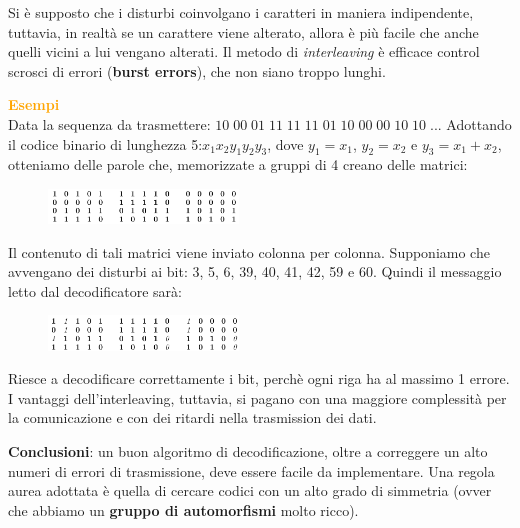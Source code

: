 \begin{flushleft}
    Si è supposto che i disturbi coinvolgano i caratteri in maniera indipendente, tuttavia, in realtà se un carattere viene alterato, allora è più facile che anche quelli vicini a lui vengano alterati. Il metodo di \textit{interleaving} è efficace control scrosci di errori (\textbf{burst errors}), che non siano troppo lunghi.

    \textcolor{orange}{\textbf{Esempi}} \\
    Data la sequenza da trasmettere: $10 \; 00 \; 01 \; 11 \; 11 \; 11 \; 01 \; 10 \; 00 \; 00 \; 10 \; 10 \; ...$
    Adottando il codice binario di lunghezza 5:$x_1x_2y_1y_2y_3$, dove $y_1 = x_1$, $y_2 = x_2$ e $y_3 = x_1 + x_2$, otteniamo delle parole che, memorizzate a gruppi di 4 creano delle matrici:

    \begin{figure}[h]
        \centering
        \includegraphics[width=0.45\textwidth]{img/interleaving_1}
    \end{figure}
    Il contenuto di tali matrici viene inviato colonna per colonna. Supponiamo che avvengano dei disturbi ai bit: 3, 5, 6, 39, 40, 41, 42, 59 e 60. Quindi il messaggio letto dal decodificatore sarà:

    \begin{figure}[h]
        \centering
        \includegraphics[width=0.45\textwidth]{img/interleaving_2}
    \end{figure}
    Riesce a decodificare correttamente i bit, perchè ogni riga ha al massimo 1 errore. I vantaggi dell'interleaving, tuttavia, si pagano con una maggiore complessità per la comunicazione e con dei ritardi nella trasmission dei dati.

    \textbf{Conclusioni}: un buon algoritmo di decodificazione, oltre a correggere un alto numeri di errori di trasmissione, deve essere facile da implementare. Una regola aurea adottata è quella di cercare codici con un alto grado di simmetria (ovver che abbiamo un \textbf{gruppo di automorfismi} molto ricco).
\end{flushleft}